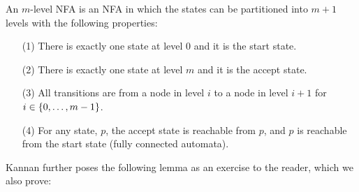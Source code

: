 \documentclass[12pt]{article}
\begin{document}
\begin{definition}
  An \(m\)-level NFA is an NFA in which the states can be
  partitioned into \(m + 1\) levels with the following properties:
  \begin{enumerate}
    \item[(1)]
      There is exactly one state at level \(0\) and it is the start state.

    \item[(2)]
      There is exactly one state at level \(m\) and it is the accept state.

    \item[(3)]
      All transitions are from a node in level \(i\) to a node in
      level \(i + 1\) for \(i \in \left\{0, \ldots, m - 1\right\}\).

    \item[(4)]
      For any state, \(p\),
      the accept state is reachable from \(p\),
      and \(p\) is reachable from the start state
      (fully connected automata).
  \end{enumerate}
\end{definition}

Kannan further poses the following lemma as an exercise to the reader,
which we also prove:
\end{document}

